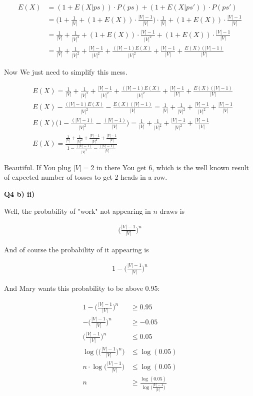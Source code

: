 \documentclass{article}
\begin{document}
	\begin{align}
		E(X) &= (1+E(X|ps))\cdot P(ps) + (1+E(X|ps'))\cdot P(ps')\\
		&= \bigg(1+\frac{1}{|V|} + (1+E(X))\cdot \frac{|V|-1}{|V|}\bigg)\cdot \frac{1}{|V|} + (1+E(X))\cdot \frac{|V| - 1}{|V|}\\
		&= \frac{1}{|V|}+\frac{1}{|V|^2} + (1+E(X))\cdot \frac{|V|-1}{|V|^2} + (1+E(X))\cdot \frac{|V|-1}{|V|}\\
		&= \frac{1}{|V|}+\frac{1}{|V|^2} + \frac{|V|-1}{|V|^2} + \frac{(|V|-1)E(X)}{|V|^2} + \frac{|V|-1}{|V|}+\frac{E(X)(|V|-1)}{|V|}
	\end{align}
	
	Now We just need to simplify this mess.
	
	\begin{align}
		&E(X) = \frac{1}{|V|}+\frac{1}{|V|^2} + \frac{|V|-1}{|V|^2} + \frac{(|V|-1)E(X)}{|V|^2} + \frac{|V|-1}{|V|}+\frac{E(X)(|V|-1)}{|V|}\\
		&E(X) - \frac{(|V|-1)E(X)}{|V|^2}-\frac{E(X)(|V|-1)}{|V|} = \frac{1}{|V|}+\frac{1}{|V|^2} + \frac{|V|-1}{|V|^2}  + \frac{|V|-1}{|V|}\\
		&E(X)\bigg(1 - \frac{(|V|-1)}{|V|^2}-\frac{(|V|-1)}{|V|}\bigg) = \frac{1}{|V|}+\frac{1}{|V|^2} + \frac{|V|-1}{|V|^2}  + \frac{|V|-1}{|V|}\\
		&E(X) = \frac{\frac{1}{|V|}+\frac{1}{|V|^2} + \frac{|V|-1}{|V|^2}  + \frac{|V|-1}{|V|}}{1 - \frac{(|V|-1)}{|V|^2}-\frac{(|V|-1)}{|V|}}
	\end{align}
	
	Beautiful. If You plug $|V|=2$ in there You get 6, which is the well known result of expected number of tosses to get 2 heads in a row. 
	
\textbf{Q4 b) ii)}

	Well, the probability of "work" not appearing in $n$ draws is
	
	\begin{align}
		\bigg( \frac{|V|-1}{|V|}\bigg)^n
	\end{align}
	
	And of course the probability of it appearing is
	
	\begin{align}
		1 - \bigg( \frac{|V|-1}{|V|}\bigg)^n
	\end{align}
	
	And Mary wants this probability to be above 0.95:

	\begin{align}
		1 - \bigg( \frac{|V|-1}{|V|}\bigg)^n &\ge 0.95\\
		- \bigg( \frac{|V|-1}{|V|}\bigg)^n &\ge -0.05\\
		\bigg( \frac{|V|-1}{|V|}\bigg)^n &\le 0.05\\
		\log\bigg(\bigg( \frac{|V|-1}{|V|}\bigg)^n\bigg) &\le \log(0.05)\\
		n\cdot\log\bigg( \frac{|V|-1}{|V|}\bigg) &\le \log(0.05)\\
		n &\ge \frac{\log(0.05)}{\log\big( \frac{|V|-1}{|V|}\big)}\\
	\end{align}
	
\end{document}
